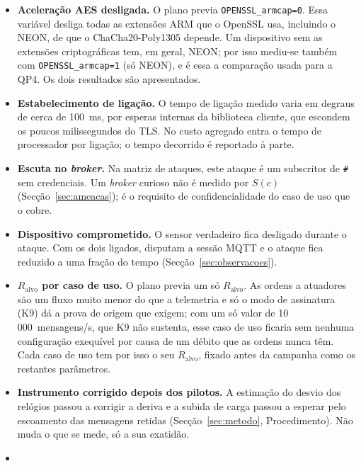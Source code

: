 \begin{itemize}[leftmargin=*]
  \item \textbf{Aceleração AES desligada.} O plano previa
    \texttt{OPENSSL\_armcap=0}. Essa variável desliga todas as extensões ARM que o
    OpenSSL usa, incluindo o NEON, de que o ChaCha20-Poly1305 depende. Um
    dispositivo sem as extensões criptográficas tem, em geral, NEON; por isso
    mediu-se também com \texttt{OPENSSL\_armcap=1} (só NEON), e é essa a
    comparação usada para a QP4. Os dois resultados são apresentados.
  \item \textbf{Estabelecimento de ligação.} O tempo de ligação medido varia em
    degraus de cerca de 100~ms, por esperas internas da biblioteca cliente, que
    escondem os poucos milissegundos do TLS. No custo agregado entra o tempo de
    processador por ligação; o tempo decorrido é reportado à parte.
  \item \textbf{Escuta no \emph{broker}.} Na matriz de ataques, este ataque é um
    subscritor de \texttt{\#} sem credenciais. Um \emph{broker} curioso não é
    medido por $S(c)$ (Secção~\ref{sec:ameacas}); é o requisito de
    confidencialidade do caso de uso que o cobre.
  \item \textbf{Dispositivo comprometido.} O sensor verdadeiro fica desligado
    durante o ataque. Com os dois ligados, disputam a sessão MQTT e o ataque fica
    reduzido a uma fração do tempo (Secção~\ref{sec:observacoes}).
  \item \textbf{$R_{\text{alvo}}$ por caso de uso.} O plano previa um só
    $R_{\text{alvo}}$. As ordens a atuadores são um fluxo muito menor do que a
    telemetria e só o modo de assinatura (K9) dá a prova de origem que exigem;
    com um só valor de 10\,000~mensagens/s, que K9 não sustenta, esse caso de uso
    ficaria sem nenhuma configuração exequível por causa de um débito que as
    ordens nunca têm. Cada caso de uso tem por isso o seu $R_{\text{alvo}}$, fixado
    antes da campanha como os restantes parâmetros.
  \item \textbf{Instrumento corrigido depois dos pilotos.} A estimação do desvio
    dos relógios passou a corrigir a deriva e a subida de carga passou a esperar
    pelo escoamento das mensagens retidas (Secção~\ref{sec:metodo}, Procedimento).
    Não muda o que se mede, só a sua exatidão.
  \item {}
\end{itemize}
